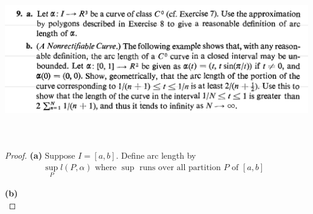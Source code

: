 \documentclass{report}
\begin{document}
\begin{question}{}{}
\includegraphics[height=7cm,width=18cm]{qu6}
\end{question}
\begin{proof}
\textbf{(a)} 
Suppose $I=[a,b]$. Define arc length by 
\begin{align*}
\sup_{P} l(P,\alpha )\text{ where $\sup $ runs over all partition $P$ of $[a,b]$  }
\end{align*}

\textbf{(b)}\\


\end{proof}
\end{document}
